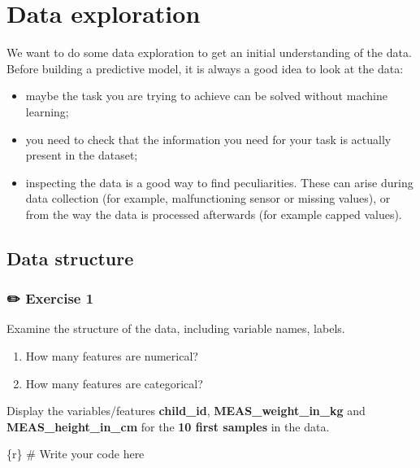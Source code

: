 \documentclass[
  letterpaper,
  DIV=11,
  numbers=noendperiod,
  oneside]{scrreprt}
\newenvironment{Shaded}{\begin{snugshade}}{\end{snugshade}}
\newcommand{\CommentTok}[1]{\textcolor[rgb]{0.37,0.37,0.37}{#1}}
\newcommand{\InformationTok}[1]{\textcolor[rgb]{0.37,0.37,0.37}{#1}}
\providecommand{\tightlist}{%
  \setlength{\itemsep}{0pt}\setlength{\parskip}{0pt}}\usepackage{longtable,booktabs,array}
\begin{document}
\hypertarget{data-exploration}{%
\section{Data exploration}\label{data-exploration}}

We want to do some data exploration to get an initial understanding of
the data. Before building a predictive model, it is always a good idea
to look at the data:

\begin{itemize}
\tightlist
\item
  maybe the task you are trying to achieve can be solved without machine
  learning;
\item
  you need to check that the information you need for your task is
  actually present in the dataset;
\item
  inspecting the data is a good way to find peculiarities. These can
  arise during data collection (for example, malfunctioning sensor or
  missing values), or from the way the data is processed afterwards (for
  example capped values).
\end{itemize}

\hypertarget{data-structure}{%
\subsection{Data structure}\label{data-structure}}

\subsubsection{\texorpdfstring{{✏️} Exercise 1}{✏️ Exercise 1}}

Examine the structure of the data, including variable names, labels.

\begin{enumerate}
\def\labelenumi{\arabic{enumi}.}
\tightlist
\item
  How many features are numerical?
\item
  How many features are categorical?
\end{enumerate}

Display the variables/features \textbf{child\_id},
\textbf{MEAS\_weight\_in\_kg} and \textbf{MEAS\_height\_in\_cm} for the
\textbf{10 first samples} in the data.

\begin{Shaded}
\begin{Highlighting}[]
\InformationTok{\textasciigrave{}\textasciigrave{}\textasciigrave{}\{r\}}
\CommentTok{\# Write your code here}
\InformationTok{\textasciigrave{}\textasciigrave{}\textasciigrave{}}
\end{Highlighting}
\end{Shaded}
\end{document}
